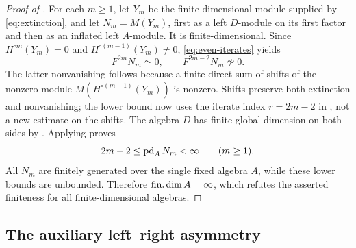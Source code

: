 \begin{proof}[Proof of ]
For each \(m\ge1\), let \(Y_m\) be the finite-dimensional
module supplied by \eqref{eq:extinction}, and let
\(N_m=M(Y_m)\), first as a left \(D\)-module on its
first factor and then as an inflated left \(A\)-module.
It is finite-dimensional.
Since \(H^{\circ m}(Y_m)=0\) and \(H^{\circ(m-1)}(Y_m)\ne0\),
\eqref{eq:even-iterates} yields
\[
F^{2m}N_m\simeq0,\qquad
F^{2m-2}N_m\not\simeq0.
\]
The latter nonvanishing follows because a finite
direct sum of shifts of the nonzero module
\(M(H^{\circ(m-1)}(Y_m))\) is nonzero. Shifts preserve both extinction
and nonvanishing; the lower bound now uses the iterate index
\(r=2m-2\) in , not a new estimate on the shifts.
The algebra \(D\) has finite global dimension on both
sides by .
Applying  proves
\[
2m-2\le\operatorname{pd}_A N_m<\infty
\qquad(m\ge1).
\]
All \(N_m\) are finitely generated over the single
fixed algebra \(A\), while these lower bounds are
unbounded.  Therefore \(\operatorname{fin.dim} A=\infty\), which
refutes the asserted finiteness for all
finite-dimensional algebras.
\end{proof}

\subsection{The auxiliary left--right asymmetry}
\label{sec:left-right-asymmetry}

